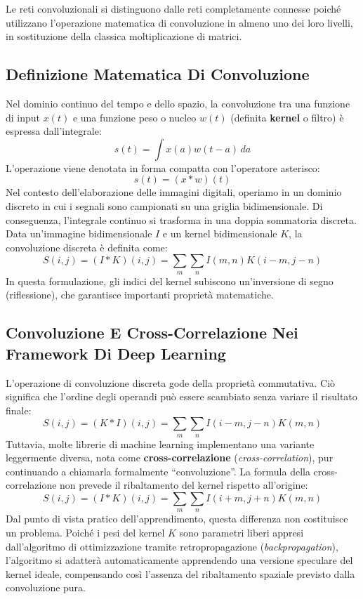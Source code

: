 ﻿\documentclass[11pt, a4paper]{article}
\begin{document}
Le reti convoluzionali si distinguono dalle reti completamente connesse poiché utilizzano l'operazione matematica di convoluzione in almeno uno dei loro livelli, in sostituzione della classica moltiplicazione di matrici.

\subsection{Definizione Matematica Di Convoluzione}

Nel dominio continuo del tempo e dello spazio, la convoluzione tra una funzione di input $x(t)$ e una funzione peso o nucleo $w(t)$ (definita \textbf{kernel} o filtro) è espressa dall'integrale:
\[
s(t) = \int x(a)w(t - a)\,da
\]
L'operazione viene denotata in forma compatta con l'operatore asterisco:
\[
s(t) = (x * w)(t)
\]
Nel contesto dell'elaborazione delle immagini digitali, operiamo in un dominio discreto in cui i segnali sono campionati su una griglia bidimensionale. Di conseguenza, l'integrale continuo si trasforma in una doppia sommatoria discreta. Data un'immagine bidimensionale $I$ e un kernel bidimensionale $K$, la convoluzione discreta è definita come:
\[
S(i, j) = (I * K)(i, j) = \sum_{m} \sum_{n} I(m, n) K(i - m, j - n)
\]
In questa formulazione, gli indici del kernel subiscono un'inversione di segno (riflessione), che garantisce importanti proprietà matematiche.

\subsection{Convoluzione E Cross-Correlazione Nei Framework Di Deep Learning}

L'operazione di convoluzione discreta gode della proprietà commutativa. Ciò significa che l'ordine degli operandi può essere scambiato senza variare il risultato finale:
\[
S(i, j) = (K * I)(i, j) = \sum_{m} \sum_{n} I(i - m, j - n) K(m, n)
\]
Tuttavia, molte librerie di machine learning implementano una variante leggermente diversa, nota come \textbf{cross-correlazione} (\emph{cross-correlation}), pur continuando a chiamarla formalmente ``convoluzione''. La formula della cross-correlazione non prevede il ribaltamento del kernel rispetto all'origine:
\[
S(i, j) = (I * K)(i, j) = \sum_{m} \sum_{n} I(i + m, j + n) K(m, n)
\]
Dal punto di vista pratico dell'apprendimento, questa differenza non costituisce un problema. Poiché i pesi del kernel $K$ sono parametri liberi appresi dall'algoritmo di ottimizzazione tramite retropropagazione (\emph{backpropagation}), l'algoritmo si adatterà automaticamente apprendendo una versione speculare del kernel ideale, compensando così l'assenza del ribaltamento spaziale previsto dalla convoluzione pura.
\end{document}
